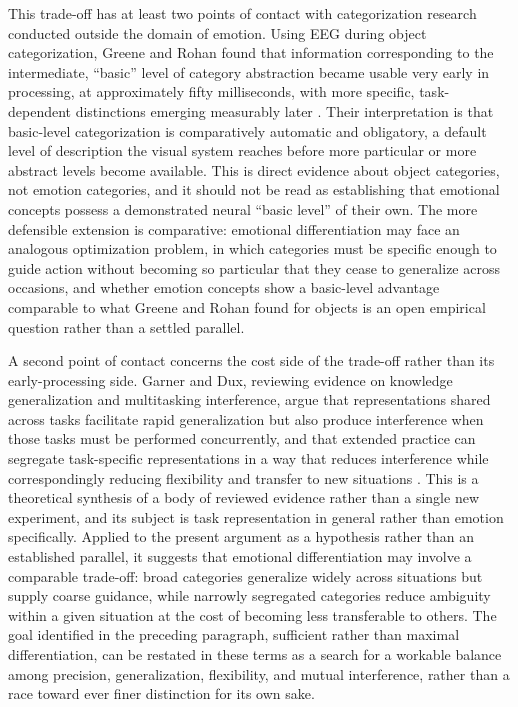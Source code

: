 \documentclass[11pt]{article}
\begin{document}
This trade-off has at least two points of contact with categorization research conducted outside the domain of emotion. Using EEG during object categorization, Greene and Rohan found that information corresponding to the intermediate, ``basic'' level of category abstraction became usable very early in processing, at approximately fifty milliseconds, with more specific, task-dependent distinctions emerging measurably later \citep{GreeneRohan2025}. Their interpretation is that basic-level categorization is comparatively automatic and obligatory, a default level of description the visual system reaches before more particular or more abstract levels become available. This is direct evidence about object categories, not emotion categories, and it should not be read as establishing that emotional concepts possess a demonstrated neural ``basic level'' of their own. The more defensible extension is comparative: emotional differentiation may face an analogous optimization problem, in which categories must be specific enough to guide action without becoming so particular that they cease to generalize across occasions, and whether emotion concepts show a basic-level advantage comparable to what Greene and Rohan found for objects is an open empirical question rather than a settled parallel.

A second point of contact concerns the cost side of the trade-off rather than its early-processing side. Garner and Dux, reviewing evidence on knowledge generalization and multitasking interference, argue that representations shared across tasks facilitate rapid generalization but also produce interference when those tasks must be performed concurrently, and that extended practice can segregate task-specific representations in a way that reduces interference while correspondingly reducing flexibility and transfer to new situations \citep{GarnerDux2023}. This is a theoretical synthesis of a body of reviewed evidence rather than a single new experiment, and its subject is task representation in general rather than emotion specifically. Applied to the present argument as a hypothesis rather than an established parallel, it suggests that emotional differentiation may involve a comparable trade-off: broad categories generalize widely across situations but supply coarse guidance, while narrowly segregated categories reduce ambiguity within a given situation at the cost of becoming less transferable to others. The goal identified in the preceding paragraph, sufficient rather than maximal differentiation, can be restated in these terms as a search for a workable balance among precision, generalization, flexibility, and mutual interference, rather than a race toward ever finer distinction for its own sake.
\end{document}
